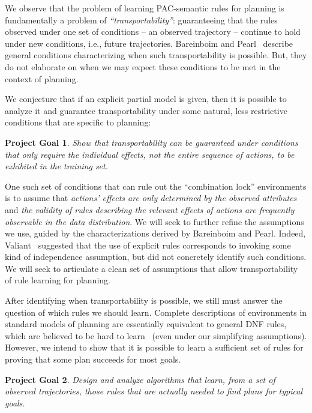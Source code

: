 \documentclass[12pt]{article}
\newtheorem{problem}{Project Goal}
\begin{document}
We observe that the problem of learning PAC-semantic rules for planning is fundamentally a problem of {\em ``transportability''}: guaranteeing that the rules observed under one set of conditions -- an observed trajectory -- continue to hold under new conditions, i.e., future trajectories. Bareinboim and Pearl~\cite{bareinboim2012completeness,bareinboim2013algorithm} describe general conditions characterizing when such transportability is possible. %
But, they do not elaborate on when we may expect these conditions to be met in the context of planning.

We conjecture that if an explicit partial model is given, then it is possible to analyze it and guarantee transportability under some natural, less restrictive conditions that are specific to planning:
\begin{problem}
Show that transportability can be guaranteed under conditions that only require the individual effects, not the entire sequence of actions, to be exhibited in the training set. 
\end{problem}
One such set of conditions that can rule out the ``combination lock'' environments is to assume that {\em actions' effects are only determined by the observed attributes} and {\em the validity of rules describing the relevant effects of actions are frequently observable in the data distribution}. We will seek to further refine the assumptions we use, guided by the characterizations derived by Bareinboim and Pearl. Indeed, Valiant~\cite{valiant2006knowledgeInfusion} suggested that the use of explicit rules corresponds to invoking some kind of independence assumption, but did not concretely identify such conditions. We will seek to articulate a clean set of assumptions that allow transportability of rule learning for planning.




After identifying when transportability is possible, we still must answer the question of which rules we should  learn. Complete descriptions of environments in standard models of planning are essentially equivalent to general DNF rules, which are believed to be hard to learn~\cite{daniely2016dnf} (even under our simplifying assumptions). However, we intend to show that it is possible to learn a sufficient set of rules for proving that some plan succeeds for most goals.
\begin{problem}
Design and analyze algorithms that learn, from a set of observed trajectories, those rules that are actually needed to find plans for typical goals.
\end{problem}
\end{document}
